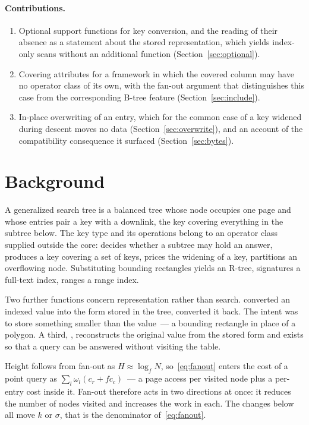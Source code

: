 \paragraph{Contributions.}

\begin{enumerate}
\item Optional support functions for key conversion, and the reading of their
      absence as a statement about the stored representation, which yields
      index-only scans without an additional function
      (Section~\ref{sec:optional}).
\item Covering attributes for a framework in which the covered column may have
      no operator class of its own, with the fan-out argument that distinguishes
      this case from the corresponding B-tree feature (Section~\ref{sec:include}).
\item In-place overwriting of an entry, which for the common case of a key
      widened during descent moves no data (Section~\ref{sec:overwrite}), and an
      account of the compatibility consequence it surfaced
      (Section~\ref{sec:bytes}).
\end{enumerate}

\section{Background}
\label{sec:background}

A generalized search tree is a balanced tree whose node occupies one page and
whose entries pair a key with a downlink, the key covering everything in the
subtree below. The key type and its operations belong to an operator class
supplied outside the core:  decides whether a subtree may hold
an answer,  produces a key covering a set of keys, 
prices the widening of a key,  partitions an overflowing node.
Substituting bounding rectangles yields an R-tree, signatures a full-text index,
ranges a range index.

Two further functions concern representation rather than search.
 converted an indexed value into the form stored in the tree,
 converted it back. The intent was to store something smaller
than the value~--- a bounding rectangle in place of a polygon. A third,
, reconstructs the original value from the stored form and exists so
that a query can be answered without visiting the table.

Height follows from fan-out as $H \approx \log_f N$, so~\eqref{eq:fanout} enters
the cost of a point query as
$\sum_l \omega_l (c_r + f c_c)$~--- a page access per visited node plus a
per-entry cost inside it. Fan-out therefore acts in two directions at once: it
reduces the number of nodes visited and increases the work in each. The changes
below all move $k$ or $\sigma$, that is the denominator of~\eqref{eq:fanout}.

